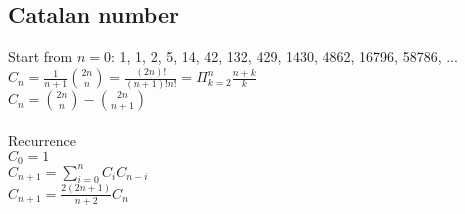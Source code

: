 \subsection{Catalan number}

\begin{center}
Start from \(n = 0\): 1, 1, 2, 5, 14, 42, 132, 429, 1430, 4862, 16796, 58786, ... \\
\(C_n = \frac{1}{n + 1} \binom{2n}{n} = \frac{(2n)!}{(n + 1)! n!} = \Pi_{k = 2}^n \frac{n + k}{k}\) \\
\(C_n = \binom{2n}{n} - \binom{2n}{n + 1}\) \\
\\
Recurrence \\
\(C_0 = 1\) \\
\(C_{n + 1} = \sum_{i = 0}^n C_i C_{n - i}\) \\
\(C_{n + 1} = \frac{2(2n + 1)}{n + 2} C_n\) \\
\end{center}
